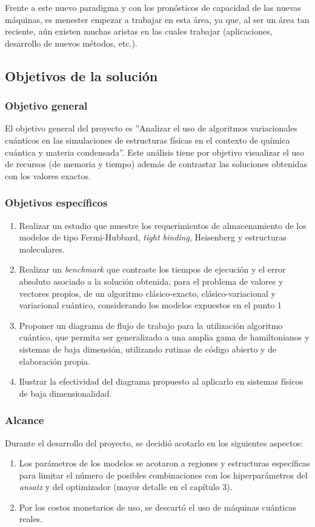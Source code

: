 Frente a este nuevo paradigma y con los pronósticos de capacidad de las nuevas máquinas, es menester empezar a trabajar en esta área, ya que, al ser un área tan reciente, aún existen muchas aristas en las cuales trabajar (aplicaciones, desarrollo de nuevos métodos, etc.).


\subsection{Objetivos de la solución}
\subsubsection{Objetivo general}
El objetivo general del proyecto es ''Analizar el uso de algoritmos variacionales cuánticos en las simulaciones de estructuras físicas en el contexto de química cuántica y materia condensada''. Este análisis tiene por objetivo visualizar el uso de recursos (de memoria y tiempo) además de contrastar las soluciones obtenidas con los valores exactos.

\subsubsection{Objetivos específicos}
\begin{enumerate}
\item Realizar un estudio que muestre los requerimientos de almacenamiento de los modelos de tipo Fermi-Hubbard, \textit{tight binding}, Heisenberg y estructuras moleculares.
\item Realizar un \textit{benchmark} que contraste los tiempos de ejecución y el error absoluto asociado a la solución obtenida, para el problema de valores y vectores propios, de un algoritmo clásico-exacto, clásico-variacional y variacional cuántico, considerando los modelos expuestos en el punto 1
\item Proponer un diagrama de flujo de trabajo para la utilización algoritmo cuántico, que permita ser generalizado a una amplia gama de hamiltonianos y sistemas de baja dimensión, utilizando rutinas de código abierto y de elaboración propia.
\item Ilustrar la efectividad del diagrama propuesto al aplicarlo en sistemas físicos de baja dimensionalidad.
\end{enumerate}

\subsubsection{Alcance}
Durante el desarrollo del proyecto, se decidió acotarlo en los siguientes aspectos:
\begin{enumerate}
    \item Los parámetros de los modelos se acotaron a regiones y estructuras específicas para limitar el número de posibles combinaciones con los hiperparámetros del \textit{ansatz} y del optimizador (mayor detalle en el capítulo 3).
    \item Por los costos monetarios de uso, se descartó el uso de máquinas cuánticas reales.
\end{enumerate}

